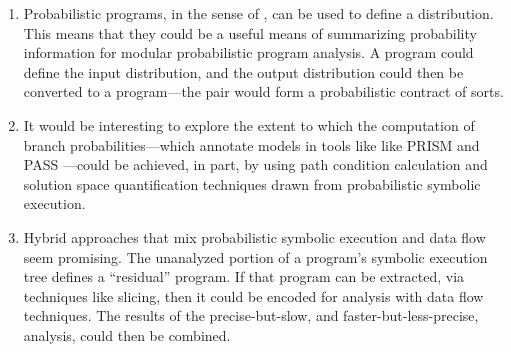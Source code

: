 \begin{enumerate}
\item Probabilistic programs, in the sense of \cite{Gordon2014}, can be used
to define a distribution.  This means that they could be a useful means of
summarizing probability information for modular probabilistic program analysis.
A program could define the input distribution, and the output distribution
could then be converted to a program---the pair would form a probabilistic
contract of sorts.

\item It would be interesting to explore the extent
to which the computation of branch probabilities---which annotate
models in tools like like PRISM \cite{kwiatkowska2011prism} and 
PASS \cite{hahn2010pass}---could be achieved,
in part, by using path condition calculation and solution
space quantification techniques drawn from probabilistic symbolic
execution.  

\item Hybrid approaches that mix probabilistic symbolic execution
and data flow seem promising.  The unanalyzed portion of a program's
symbolic execution tree defines a ``residual'' program.  If that
program can be extracted, via techniques like slicing, then it
could be encoded for analysis with data flow techniques.  The
results of the precise-but-slow, and faster-but-less-precise,
analysis, could then be combined. 

\end{enumerate}
